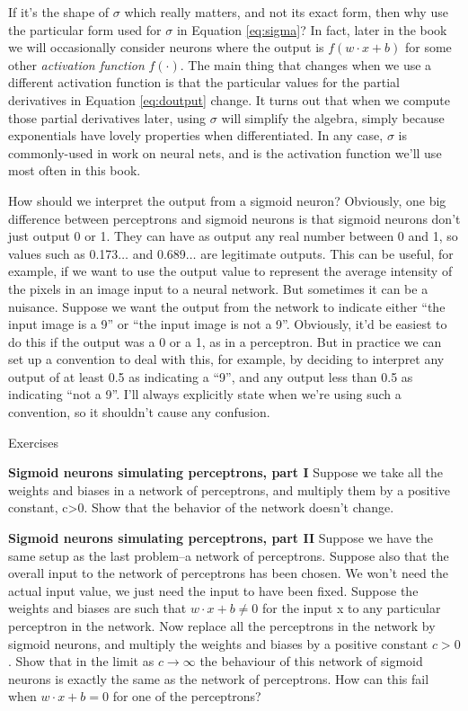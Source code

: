 \documentclass[a4paper,twoside,10pt]{book}
\begin{document}
If it's the shape of $\sigma$ which really matters, and not its exact form, then why use the particular form used for $\sigma$ in Equation \ref{eq:sigma}? In fact, later in the book we will occasionally consider neurons where the output is $f(w\cdot x + b)$ for some other \textit{activation function} $f(\cdot)$. The main thing that changes when we use a different activation function is that the particular values for the partial derivatives in Equation \ref{eq:doutput} change. It turns out that when we compute those partial derivatives later, using $\sigma$ will simplify the algebra, simply because exponentials have lovely properties when differentiated. In any case, $\sigma$ is commonly-used in work on neural nets, and is the activation function we'll use most often in this book.

How should we interpret the output from a sigmoid neuron? Obviously, one big difference between perceptrons and sigmoid neurons is that sigmoid neurons don't just output 0 or 1. They can have as output any real number between 0 and 1, so values such as 0.173$\ldots$ and 0.689$\ldots$ are legitimate outputs. This can be useful, for example, if we want to use the output value to represent the average intensity of the pixels in an image input to a neural network. But sometimes it can be a nuisance. Suppose we want the output from the network to indicate either ``the input image is a 9'' or ``the input image is not a 9''. Obviously, it'd be easiest to do this if the output was a 0 or a 1, as in a perceptron. But in practice we can set up a convention to deal with this, for example, by deciding to interpret any output of at least 0.5 as indicating a ``9'', and any output less than 0.5 as indicating ``not a 9''. I'll always explicitly state when we're using such a convention, so it shouldn't cause any confusion.

\begin{exercize}{Exercises}
\item \textbf{Sigmoid neurons simulating perceptrons, part I} Suppose we take all the weights and biases in a network of perceptrons, and multiply them by a positive constant, c>0. Show that the behavior of the network doesn't change.

\item \textbf{Sigmoid neurons simulating perceptrons, part II} Suppose we have the same setup as the last problem--a network of perceptrons. Suppose also that the overall input to the network of perceptrons has been chosen. We won't need the actual input value, we just need the input to have been fixed. Suppose the weights and biases are such that $w\cdot x + b \ne 0$ for the input x to any particular perceptron in the network. Now replace all the perceptrons in the network by sigmoid neurons, and multiply the weights and biases by a positive constant $c>0$. Show that in the limit as $c\to\infty$ the behaviour of this network of sigmoid neurons is exactly the same as the network of perceptrons. How can this fail when $w\cdot x+b=0$ for one of the perceptrons?
\end{exercize}
\end{document}
